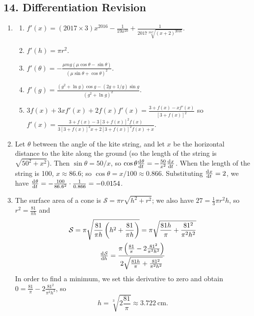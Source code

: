 \subsection*{14. Differentiation Revision}
\begin{enumerate}
  \item
    \begin{enumerate}
      \item $ f'(x) = (2017 \times 3)x^{2016} - \frac{1}{19x^{20}} + \frac{1}{2017 \sqrt[2017]{(x + 2)^{2016}}} $.
      \item $ f'(h) = \pi r^2 $.
      \item $ f'(\theta) = -\frac{\mu m g (\mu \cos \theta - \sin \theta)}{(\mu \sin \theta + \cos \theta)^2} $.
      \item $ f'(g) = \frac{(g^2 + \ln g)\cos g - (2g + 1/g)\sin g}{(g^2 + \ln g)^2} $.
      \item $ 3f(x) + 3xf'(x) + 2f(x) f'(x) = \frac{3 + f(x) - xf'(x)}{[3 + f(x)]^2} $
            so $ f'(x) = \frac{3 + f(x) - 3[3 + f(x)]^2f(x)}{3[3 + f(x)]^2x + 2[3 + f(x)]^2f(x) + x} $.
    \end{enumerate}
  \item Let $ \theta $ between the angle of the kite string, and let $ x $ be the horizontal distance to the kite along the ground (so the
        length of the string is $ \sqrt{50^2 + x^2} $). Then $ \sin \theta = 50/x $, so $ \cos \theta \od{\theta}{t} = -\frac{50}{x^2} \od{x}{t} $.
        When the length of the string is 100, $ x \approx 86.6 $; so $ \cos \theta = x/100 \approx 0.866 $. Substituting $ \od{x}{t} = 2 $, we have
        $ \od{\theta}{t} = -\frac{100}{86.6^2} \cdot \frac{1}{0.866} = -0.0154 $.
  \item The surface area of a cone is $ \mathcal{S} = \pi r \sqrt{h^2 + r^2} $; we also have $ 27 = \frac{1}{3} \pi r^2 h $,
        so $ r^2 = \frac{81}{\pi h} $ and
        \begin{gather*}
          \mathcal{S} = \pi \sqrt{\frac{81}{\pi h}\left(h^2 + \frac{81}{\pi h}\right)} = \pi \sqrt{\frac{81h}{\pi} + \frac{81^2}{\pi^2 h^2}}\\
          \od{\mathcal{S}}{h} = \frac{\pi \left( \frac{81}{\pi} - 2\frac{81^2}{\pi^2 h^3} \right) }{2\sqrt{\frac{81h}{\pi} + \frac{81^2}{\pi^2 h^2}}}
        \end{gather*}
        In order to find a minimum, we set this derivative to zero and obtain $ 0 = \frac{81}{\pi} - 2\frac{81^2}{\pi^2 h^3} $, so
        \begin{displaymath}
          h = \sqrt[3]{ 2\frac{81}{\pi} } \approx \SI{3.722}{\centi\metre}.

\end{displaymath}
\end{enumerate}
